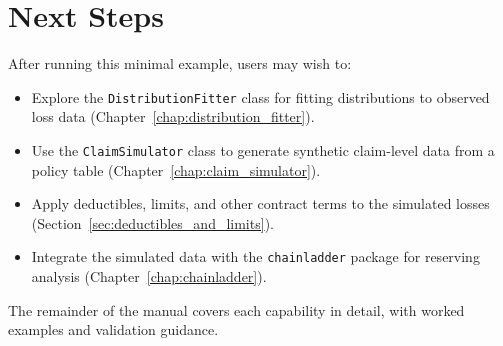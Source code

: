 \section{Next Steps}

After running this minimal example, users may wish to:

\begin{itemize}[leftmargin=*]
    \item Explore the \texttt{DistributionFitter} class for fitting
          distributions to observed loss data
          (Chapter~\ref{chap:distribution_fitter}).
    \item Use the \texttt{ClaimSimulator} class to generate synthetic
          claim-level data from a policy table
          (Chapter~\ref{chap:claim_simulator}).
    \item Apply deductibles, limits, and other contract terms to the
          simulated losses (Section~\ref{sec:deductibles_and_limits}).
    \item Integrate the simulated data with the \texttt{chainladder} package
          for reserving analysis (Chapter~\ref{chap:chainladder}).
\end{itemize}

The remainder of the manual covers each capability in detail, with worked
examples and validation guidance.
